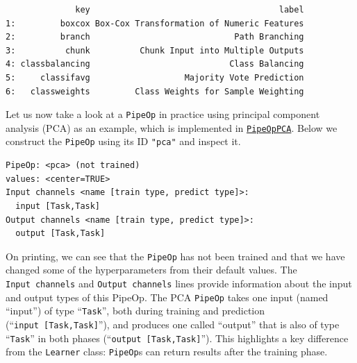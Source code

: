 \begin{verbatim}
              key                                      label
1:         boxcox Box-Cox Transformation of Numeric Features
2:         branch                             Path Branching
3:          chunk          Chunk Input into Multiple Outputs
4: classbalancing                            Class Balancing
5:     classifavg                   Majority Vote Prediction
6:   classweights         Class Weights for Sample Weighting
\end{verbatim}

Let us now take a look at a \texttt{PipeOp} in practice using principal
component analysis
(PCA) as an example, which
is implemented in
\href{https://mlr3pipelines.mlr-org.com/reference/mlr_pipeops_pca.html}{\texttt{PipeOpPCA}}.
Below we construct the \texttt{PipeOp} using its ID \texttt{"pca"} and
inspect it.

\begin{Shaded}
\begin{Highlighting}[]

\OtherTok{=} \NormalTok{(}\NormalTok{, } \NormalTok{)}
\end{Highlighting}
\end{Shaded}

\begin{verbatim}
PipeOp: <pca> (not trained)
values: <center=TRUE>
Input channels <name [train type, predict type]>:
  input [Task,Task]
Output channels <name [train type, predict type]>:
  output [Task,Task]
\end{verbatim}

On printing, we can see that the \texttt{PipeOp} has not been trained
and that we have changed some of the hyperparameters from their default
values. The \texttt{Input\ channels} and \texttt{Output\ channels} lines
provide information about the input and output types of this PipeOp. The
PCA \texttt{PipeOp} takes one input (named ``input'') of type
``\texttt{Task}'', both during training and prediction
(``\texttt{input\ {[}Task,Task{]}}''), and produces one called
``output'' that is also of type ``\texttt{Task}'' in both phases
(``\texttt{output\ {[}Task,Task{]}}''). This highlights a key difference
from the \texttt{Learner} class: \texttt{PipeOp}s can return results
after the training phase.

